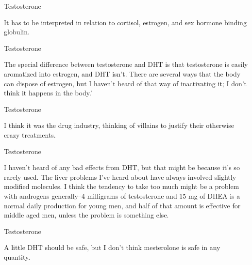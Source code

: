 \documentclass[11pt,oneside,openany,extrafontsizes]{memoir}
\begin{document}
\begin{standalonequote}{Testosterone}

    \begin{answer}
        It has to be interpreted in relation to cortisol, estrogen, and sex hormone binding globulin.
    \end{answer}
\end{standalonequote}

\begin{standalonequote}{Testosterone}

    \begin{answer}
        The special difference between testosterone and DHT is that testosterone is easily aromatized into estrogen, and DHT isn't. There are several ways that the body can dispose of estrogen, but I haven't heard of that way of inactivating it; I don't think it happens in the body.'
    \end{answer}
\end{standalonequote}

\begin{standalonequote}{Testosterone}

    \begin{answer}
        I think it was the drug industry, thinking of villains to justify their otherwise crazy treatments.
    \end{answer}
\end{standalonequote}

\begin{standalonequote}{Testosterone}

    \begin{answer}
        I haven't heard of any bad effects from DHT, but that might be because it's so rarely used. The liver problems I've heard about have always involved slightly modified molecules. I think the tendency to take too much might be a problem with androgens generally--4 milligrams of testosterone and 15 mg of DHEA is a normal daily production for young men, and half of that amount is effective for middle aged men, unless the problem is something else.
    \end{answer}
\end{standalonequote}

\begin{standalonequote}{Testosterone}

    \begin{answer}
        A little DHT should be safe, but I don't think mesterolone is safe in any quantity.
    \end{answer}
\end{standalonequote}
\end{document}
